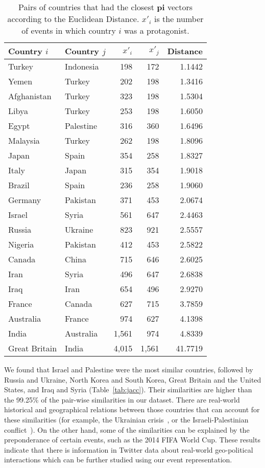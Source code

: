 \begin{table}
\caption{Pairs of countries that had the closest $\mathbf{pi}$ vectors
according to the Euclidean Distance.  $x'_i$ is the number of events in which
country $i$ was a protagonist.}\label{tab:euc}
\begin{tabular}{llrrr}
\toprule
Country $i$ & Country $j$ & $x'_i$ & $x'_j$ & Distance\\
\midrule
Turkey & Indonesia & 198 & 172 & 1.1442\\
Yemen & Turkey & 202 & 198 & 1.3416\\
Afghanistan & Turkey & 323 & 198 & 1.5304\\
Libya & Turkey & 253 & 198 & 1.6050\\
\addlinespace
Egypt & Palestine & 316 & 360 & 1.6496\\
Malaysia & Turkey & 262 & 198 & 1.8096\\
Japan & Spain & 354 & 258 & 1.8327\\
Italy & Japan & 315 & 354 & 1.9018\\
\addlinespace
Brazil & Spain & 236 & 258 & 1.9060\\
Germany & Pakistan & 371 & 453 & 2.0674\\
Israel & Syria & 561 & 647 & 2.4463\\
Russia & Ukraine & 823 & 921 & 2.5557\\
\addlinespace
Nigeria & Pakistan & 412 & 453 & 2.5822\\
Canada & China & 715 & 646 & 2.6025\\
Iran & Syria & 496 & 647 & 2.6838\\
Iraq & Iran & 654 & 496 & 2.9270\\
\addlinespace
France & Canada & 627 & 715 & 3.7859\\
Australia & France & 974 & 627 & 4.1398\\
India & Australia & 1,561 & 974 & 4.8339\\
Great Britain & India & 4,015 & 1,561 & 41.7719\\
\bottomrule
\end{tabular}
\end{table}


We found that Israel and Palestine were the most similar countries,
followed by Russia and Ukraine, North Korea and South Korea, Great
Britain and the United States, and Iraq and Syria (Table~\ref{tab:jacc}).
Their similarities are higher than the 99.25\% of the pair-wise similarities
in our dataset. There are real-world historical and geographical relations
between those countries that can account for these similarities (for example, the Ukrainian
crisis~\cite{ukranian_crisis}, or the Israeli-Palestinian
conflict~\cite{israeli_palestinian}). On the other hand, some of the
similarities can be explained by the preponderance of certain events,
such as the 2014 FIFA World Cup.
These results indicate that there is
information in Twitter data about real-world geo-political
interactions which can be further studied using our event
representation.

